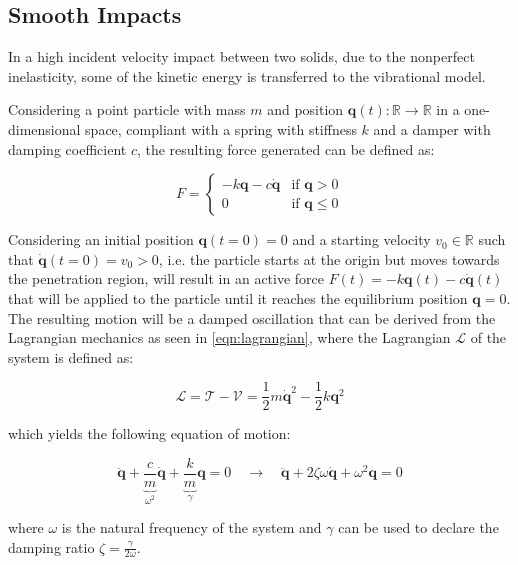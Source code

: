 \subsection{Smooth Impacts}

In a high incident velocity impact between two solids, due to the nonperfect inelasticity, some of the kinetic energy is transferred to the vibrational model.

Considering a point particle with mass $m$ and position $\mathbf{q}(t): \mathbb{R} \rightarrow \mathbb{R}$ in a one-dimensional space, compliant with a spring with stiffness $k$ and a damper with damping coefficient $c$, the resulting force generated can be defined as:

\begin{equation}
    F = \begin{cases}
        -k\mathbf{q} - c\dot{\mathbf{q}} & \text{if } \mathbf{q} > 0    \\
        0                                & \text{if } \mathbf{q} \leq 0
    \end{cases}
\end{equation}

Considering an initial position $\mathbf{q}(t=0) = 0$ and a starting velocity $v_0 \in \mathbb{R}$ such that $\dot{\mathbf{q}}(t=0) = v_0 > 0$, i.e. the particle starts at the origin but moves towards the penetration region, will result in an active force $F(t) = -k\mathbf{q}(t) - c\dot{\mathbf{q}}(t)$ that will be applied to the particle until it reaches the equilibrium position $\mathbf{q} = 0$. The resulting motion will be a damped oscillation that can be derived from the Lagrangian mechanics as seen in \cref{eqn:lagrangian}, where the Lagrangian $\mathcal{L}$ of the system is defined as:

\begin{equation}
    \mathcal{L} = \mathcal{T} - \mathcal{V} = \frac{1}{2}m\dot{\mathbf{q}}^2 - \frac{1}{2}k\mathbf{q}^2
\end{equation}

which yields the following equation of motion:

\begin{equation}
    \ddot{\mathbf{q}} + \underbrace{\frac{c}{m}} _{\omega ^2} \dot{\mathbf{q}} + \underbrace{\frac{k}{m}} _\gamma \mathbf{q} = 0 \quad \rightarrow \quad \ddot{\mathbf{q}} + 2\zeta \omega \dot{\mathbf{q}} + \omega ^2 \mathbf{q} = 0
\end{equation}

where $\omega$ is the natural frequency of the system and $\gamma$ can be used to declare the damping ratio $\zeta = \frac{\gamma}{2\omega}$.

